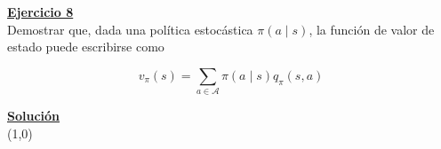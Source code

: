 \indent\underline{\textbf{Ejercicio 8}}\\
Demostrar que, dada una política estocástica $\pi (a \mid s)$, la función de valor de estado puede escribirse como

\[
    v_{\pi}(s) = \sum_{a \in \mathcal{A}} \pi(a \mid s) q_{\pi}(s, a)
\]

\indent\underline{\textbf{Solución}}\\

\line(1,0){\textwidth}
